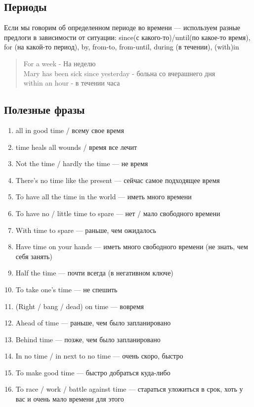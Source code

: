 \subsection{Периоды}
Если мы говорим об определенном периоде во времени — используем разные предлоги в зависимости от ситуации: since(с какого-то)/until(по какое-то время), for (на какой-то период), by, from-to, from-until, during (в течении), (with)in
\begin{quote}
	For a week - На неделю\\
	Mary has been sick since yesterday - больна со вчерашнего дня \\
	within an hour - в течении часа
\end{quote}

\subsection{Полезные фразы}
\begin{enumerate} 
	\item all in good time / всему свое время
	\item time heals all wounds / время все лечит
	\item Not the time / hardly the time — не время
	\item There’s no time like the present — сейчас самое подходящее время
	\item To have all the time in the world — иметь много времени
	\item To have no / little time to spare — нет / мало свободного времени
	\item With time to spare — раньше, чем ожидалось
	\item Have time on your hands — иметь много свободного времени (не знать, чем себя занять)
	\item Half the time — почти всегда (в негативном ключе)
	\item To take one’s time — не спешить
	\item (Right / bang / dead) on time — вовремя
	\item Ahead of time — раньше, чем было запланировано
	\item Behind time — позже, чем было запланировано
	\item In no time / in next to no time — очень скоро, быстро
	\item To make good time — быстро добраться куда-либо
	\item To race / work / battle against time — стараться уложиться в срок, хоть у вас и очень мало времени для этого 
	
\end{enumerate}


 